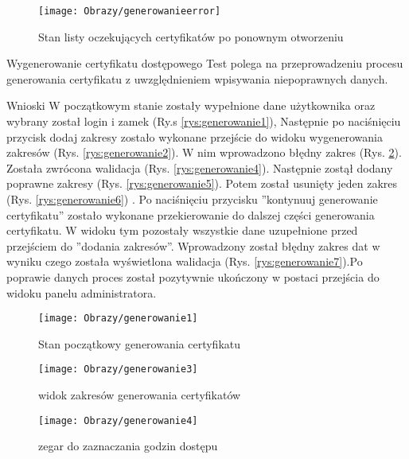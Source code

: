 \begin{enumerate*}
\begin{figure}[ht!]
	\begin{minipage}{0.2\textwidth}
		\texttt{[image: Obrazy/generowanieerror]}
		\caption{Stan listy oczekujących certyfikatów po ponownym otworzeniu}
		\label{rys:generowanieCert4}
	\end{minipage}
	
	\end{figure}
	
	
	
	\item  Wygenerowanie certyfikatu dostępowego
	Test polega na przeprowadzeniu procesu generowania certyfikatu z uwzględnieniem wpisywania niepoprawnych danych.
	
	Wnioski W początkowym stanie zostały wypełnione dane użytkownika oraz wybrany został login i zamek (Ry.s \ref{rys:generowanie1}), Następnie po naciśnięciu przycisk dodaj zakresy zostało wykonane przejście do widoku  wygenerowania zakresów (Rys. \ref{rys:generowanie2}). W nim wprowadzono  błędny zakres (Rys. \ref{rys:generowanie3}). Została zwrócona walidacja (Rys. \ref{rys:generowanie4}). Następnie zostął dodany poprawne zakresy (Rys. \ref{rys:generowanie5}). Potem został usunięty jeden zakres (Rys. \ref{rys:generowanie6})   . Po naciśnięciu przycisku ''kontynuuj generowanie certyfikatu'' zostało wykonane przekierowanie  do dalszej części generowania certyfikatu. W widoku tym pozostały wszystkie dane uzupełnione przed przejściem do ''dodania zakresów''. Wprowadzony został błędny zakres dat w wyniku czego została wyświetlona walidacja (Rys. \ref{rys:generowanie7}).Po poprawie danych proces został pozytywnie ukończony w postaci przejścia do widoku panelu administratora.
	
	
	
		\begin{figure}[ht!]
		
		\begin{minipage}{0.2\textwidth}
			\texttt{[image: Obrazy/generowanie1]}
			\caption{Stan początkowy generowania certyfikatu }
			\label{rys:generowanie1}
		\end{minipage}
	
		
		\begin{minipage}{0.2\textwidth}
			\texttt{[image: Obrazy/generowanie3]}
			\caption{widok zakresów generowania certyfikatów}
			\label{rys:generowanie2}
		\end{minipage}
		\begin{minipage}{0.2\textwidth}
			\texttt{[image: Obrazy/generowanie4]}
			\caption{zegar do zaznaczania godzin dostępu}
			\label{rys:generowanie3}
		\end{minipage}
	\end{figure}



\end{enumerate*}
